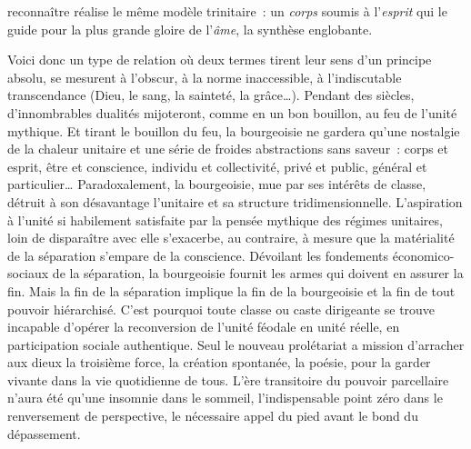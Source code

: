 \documentclass[french,twoside]{book} %
\newcommand{\astermono}{\medskip\centerline{\color{rubric}\large\selectfont{\syms ✻}}\medskip\par}%
\begin{document}
reconnaître réalise le même modèle trinitaire : un \emph{corps} soumis à l’\emph{esprit} qui le guide pour la plus grande gloire de l’\emph{âme}, la synthèse englobante.\par
Voici donc un type de relation où deux termes tirent leur sens d’un principe absolu, se mesurent à l’obscur, à la norme inaccessible, à l’indiscutable transcendance (Dieu, le sang, la sainteté, la grâce…). Pendant des siècles, d’innombrables dualités mijoteront, comme en un bon bouillon, au feu de l’unité mythique. Et tirant le bouillon du feu, la bourgeoisie ne gardera qu’une nostalgie de la chaleur unitaire et une série de froides abstractions sans saveur : corps et esprit, être et conscience, individu et collectivité, privé et public, général et particulier… Paradoxalement, la bourgeoisie, mue par ses intérêts de classe, détruit à son désavantage l’unitaire et sa structure tridimensionnelle. L’aspiration à l’unité si habilement satisfaite par la pensée mythique des régimes unitaires, loin de disparaître avec elle s’exacerbe, au contraire, à mesure que la matérialité de la séparation s’empare de la conscience. Dévoilant les fondements économico-sociaux de la séparation, la bourgeoisie fournit les armes qui doivent en assurer la fin. Mais la fin de la séparation implique la fin de la bourgeoisie et la fin de tout pouvoir hiérarchisé. C’est pourquoi toute classe ou caste dirigeante se trouve incapable d’opérer la reconversion de l’unité féodale en unité réelle, en participation sociale authentique. Seul le nouveau prolétariat a mission d’arracher aux dieux la troisième force, la création spontanée, la poésie, pour la garder vivante dans la vie quotidienne de tous. L’ère transitoire du pouvoir parcellaire n’aura été qu’une insomnie dans le sommeil, l’indispensable point zéro dans le renversement de perspective, le nécessaire appel du pied avant le bond du dépassement.\par

\astermono
\end{document}
